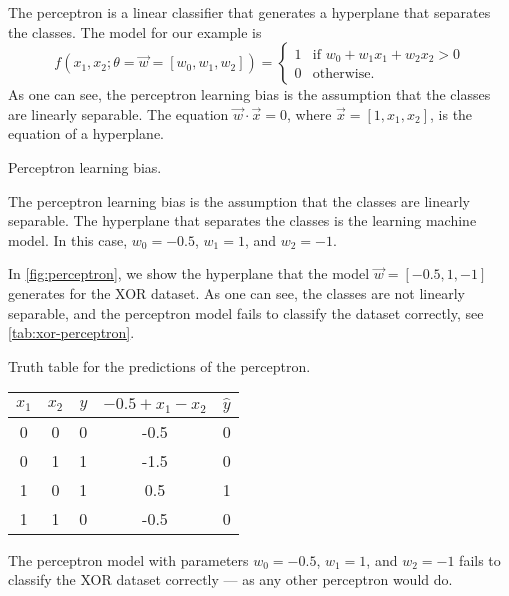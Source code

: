 The perceptron is a linear classifier that generates a hyperplane that separates the
classes.  The model for our example is
\begin{equation*}
  f(x_1, x_2; \theta = \vec{w} = \left[w_0, w_1, w_2\right]) =  \begin{cases}
    1 & \text{if } w_0 + w_1 x_1 + w_2 x_2 > 0 \\
    0 & \text{otherwise.}
  \end{cases}
\end{equation*}
As one can see, the perceptron learning bias is the assumption that the classes are
linearly separable. The equation $\vec{w} \cdot \vec{x} = 0$, where $\vec{x} = [1, x_1,
x_2]$, is the equation of a hyperplane.

\begin{figurebox}[label=fig:perceptron]{Perceptron learning bias.}
  \centering
  \tcblower
  The perceptron learning bias is the assumption that the classes are linearly separable.
  The hyperplane that separates the classes is the learning machine model.
  In this case, $w_0 = -0.5$, $w_1 = 1$, and $w_2 = -1$.
\end{figurebox}

In \cref{fig:perceptron}, we show the hyperplane that the model $\vec{w} = [-0.5, 1, -1]$
generates for the XOR dataset.  As one can see, the classes are not linearly separable,
and the perceptron model fails to classify the dataset correctly, see \cref{tab:xor-perceptron}.

\begin{tablebox}[label=tab:xor-perceptron]{Truth table for the predictions of the perceptron.}
  \centering
  \begin{tabular}{ccc|cc}
    \toprule
    $x_1$ & $x_2$ & $y$ & $-0.5 + x_1 - x_2$ & $\hat{y}$ \\
    \midrule
    0 & 0 & 0 & -0.5 & 0 \\
    0 & 1 & 1 & -1.5 & 0 \\
    1 & 0 & 1 & 0.5 & 1 \\
    1 & 1 & 0 & -0.5 & 0 \\
    \bottomrule
  \end{tabular}
  \tcblower
  The perceptron model with parameters $w_0 = -0.5$, $w_1 = 1$, and $w_2 = -1$
  fails to classify the XOR dataset correctly --- as any other perceptron would do.
\end{tablebox}

